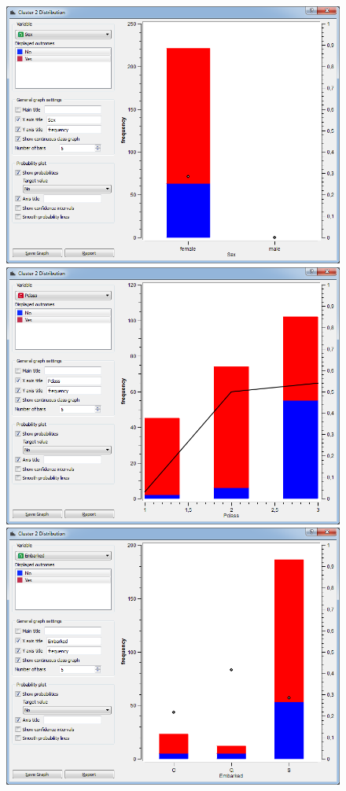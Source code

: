 \documentclass[a4paper,11pt]{article}
\begin{document}
\begin{figure}[h]
	\centering
	\begin{center}
		\includegraphics[scale=0.30]{ClusterDistribution/Cluster2/Sex}
		\includegraphics[scale=0.30]{ClusterDistribution/Cluster2/PClass}\\
		\vspace{1 mm}
		\includegraphics[scale=0.30]{ClusterDistribution/Cluster2/Embarked}

\end{center}
\end{figure}
\end{document}
